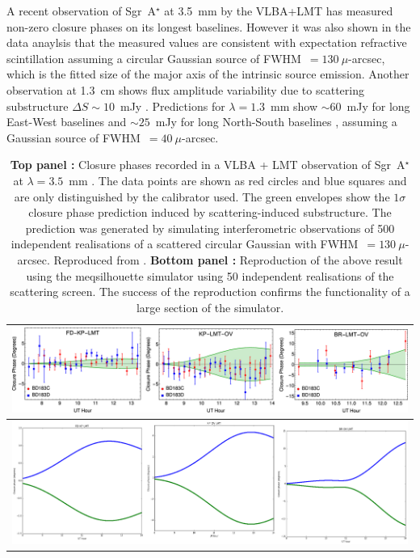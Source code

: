 A recent observation of Sgr~A$^\star$ at 3.5~mm by the VLBA+LMT \citep[see Fig.~\ref{fig:substructure2}][]{Ortiz_2016} has measured non-zero closure phases on its longest baselines. However it was also shown in the data anaylsis that the measured values are consistent with expectation refractive scintillation assuming a circular Gaussian source of FWHM~$=130\ \mu$-arcsec, which is the fitted size of the major axis of the intrinsic source emission. Another observation at 1.3~cm shows flux amplitude variability due to scattering substructure $\Delta S \sim 10$~mJy \citep{Gwinn_2014}. Predictions for $\lambda = 1.3$~mm show $\sim 60$~mJy for long East-West baselines and $\sim 25$~mJy for long North-South baselines \citep*{Johnson_2015a}, assuming a Gaussian source of FWHM~$=40\ \mu$-arcsec.


\begin{table}[h!]
\begin{tabular}{c}
\includegraphics[width=\columnwidth]{Images/ism_cp}\\
\hline
\includegraphics[width=\columnwidth]{Images/ortizrepeat}\\
\end{tabular}
\caption{{\bf Top panel :} Closure phases recorded in a VLBA + LMT observation of  Sgr~A$^\star$ at $\lambda = 3.5$~mm \protect\citep{Ortiz_2016}. The data points are shown as red circles and blue squares and are only distinguished by the calibrator used. The green envelopes show the $1\sigma$ closure phase prediction induced by scattering-induced substructure. The prediction was generated by simulating interferometric observations of 500 independent realisations of a scattered circular Gaussian with FWHM~$=130\ \mu$-arcsec. Reproduced from \protect\citet{Ortiz_2016}. {\bf Bottom panel :} Reproduction of the above result using the {\sc meqsilhouette} simulator using 50 independent realisations of the scattering screen. The success of the reproduction confirms the functionality of a large section of the simulator.\label{fig:substructure2}
}

\end{table}


